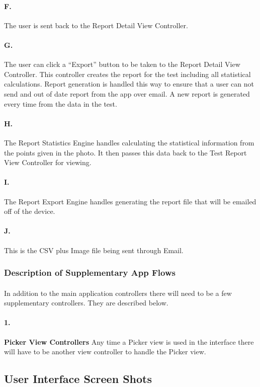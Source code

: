 \paragraph{F.} The user is sent back to the Report Detail View Controller.
\paragraph{G.} The user can click a ``Export'' button to be taken to the Report Detail View Controller. This controller creates the report for the test including all statistical calculations. Report generation is handled this way to ensure that a user can not send and out of date report from the app over email. A new report is generated every time from the data in the test. 
\paragraph{H.} The Report Statistics Engine handles calculating the statistical information from the points given in the photo. It then passes this data back to the Test Report View Controller for viewing.
\paragraph{I.} The Report Export Engine handles generating the report file that will be emailed off of the device. 
\paragraph{J.} This is the CSV plus Image file being sent through Email.

\subsubsection{Description of Supplementary App Flows}
\paragraph{} In addition to the main application controllers there will need to be a few supplementary controllers. They are described below.
\paragraph{1.} \textbf{Picker View Controllers} Any time a Picker view is used in the interface there will have to be another view controller to handle the Picker view. 

\newpage
\subsection{User Interface Screen Shots}
